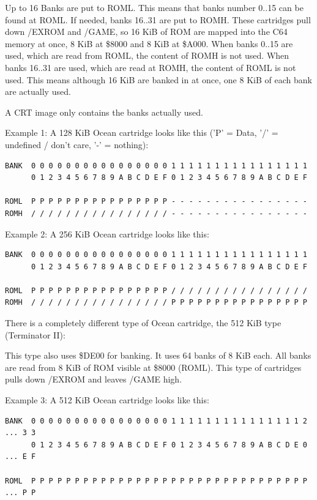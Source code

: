 \documentclass[a4paper,oneside]{memoir}
\begin{document}
Up to 16 Banks are put to ROML. This means that banks number 0..15 can be found
at ROML. If needed, banks 16..31 are put to ROMH. These cartridges pull down
/EXROM and /GAME, so 16 KiB of ROM are mapped into the C64 memory at once, 8
KiB at \$8000 and 8 KiB at \$A000.
When banks 0..15 are used, which are read from ROML, the content of ROMH is not
used. When banks 16..31 are used, which are read at ROMH, the content of ROML
is not used. This means although 16 KiB are banked in at once, one 8 KiB of
each bank are actually used.

A CRT image only contains the banks actually used.

Example 1: A 128 KiB Ocean cartridge looks like this ('P' = Data, '/' =
undefined / don't care, '-' = nothing):

\small
\begin{verbatim}
BANK  0 0 0 0 0 0 0 0 0 0 0 0 0 0 0 0 1 1 1 1 1 1 1 1 1 1 1 1 1 1 1 1
      0 1 2 3 4 5 6 7 8 9 A B C D E F 0 1 2 3 4 5 6 7 8 9 A B C D E F

ROML  P P P P P P P P P P P P P P P P - - - - - - - - - - - - - - - -
ROMH  / / / / / / / / / / / / / / / / - - - - - - - - - - - - - - - -
\end{verbatim}
\normalsize

Example 2: A 256 KiB Ocean cartridge looks like this:

\small
\begin{verbatim}
BANK  0 0 0 0 0 0 0 0 0 0 0 0 0 0 0 0 1 1 1 1 1 1 1 1 1 1 1 1 1 1 1 1
      0 1 2 3 4 5 6 7 8 9 A B C D E F 0 1 2 3 4 5 6 7 8 9 A B C D E F

ROML  P P P P P P P P P P P P P P P P / / / / / / / / / / / / / / / /
ROMH  / / / / / / / / / / / / / / / / P P P P P P P P P P P P P P P P
\end{verbatim}
\normalsize

There is a completely different type of Ocean cartridge, the 512 KiB type
(Terminator II):

This type also uses \$DE00 for banking. It uses 64 banks of 8 KiB each. All
banks are read from 8 KiB of ROM visible at \$8000 (ROML). This type of
cartridges pulls down /EXROM and leaves /GAME high.

Example 3: A 512 KiB Ocean cartridge looks like this:

\footnotesize
\begin{verbatim}
BANK  0 0 0 0 0 0 0 0 0 0 0 0 0 0 0 0 1 1 1 1 1 1 1 1 1 1 1 1 1 1 1 2 ... 3 3
      0 1 2 3 4 5 6 7 8 9 A B C D E F 0 1 2 3 4 5 6 7 8 9 A B C D E 0 ... E F

ROML  P P P P P P P P P P P P P P P P P P P P P P P P P P P P P P P P ... P P
\end{verbatim}
\normalsize
\end{document}
